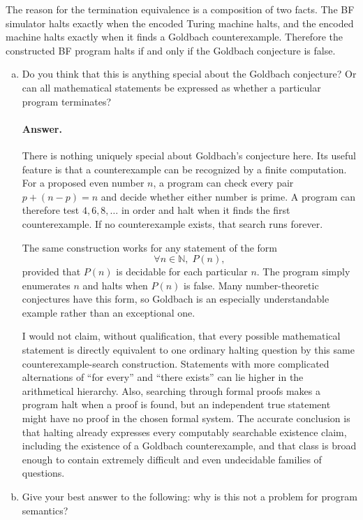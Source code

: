 \documentclass{article}
\begin{document}
\begin{enumerate}
The reason for the termination equivalence is a composition of two facts.  The
BF simulator halts exactly when the encoded Turing machine halts, and the
encoded machine halts exactly when it finds a Goldbach counterexample.
Therefore the constructed BF program halts if and only if the Goldbach
conjecture is false.

\begin{enumerate}[(a)]
\item Do you think that this is anything special about the Goldbach conjecture? Or can all mathematical statements
be expressed as whether a particular program terminates?

\paragraph{Answer.}
There is nothing uniquely special about Goldbach's conjecture here.  Its
useful feature is that a counterexample can be recognized by a finite
computation.  For a proposed even number $n$, a program can check every pair
$p+(n-p)=n$ and decide whether either number is prime.  A program can therefore
test $4,6,8,\ldots$ in order and halt when it finds the first counterexample.
If no counterexample exists, that search runs forever.

The same construction works for any statement of the form
\[
\forall n\in\mathbb{N},\;P(n),
\]
provided that $P(n)$ is decidable for each particular $n$.  The program simply
enumerates $n$ and halts when $P(n)$ is false.  Many number-theoretic
conjectures have this form, so Goldbach is an especially understandable
example rather than an exceptional one.

I would not claim, without qualification, that every possible mathematical
statement is directly equivalent to one ordinary halting question by this
same counterexample-search construction.  Statements with more complicated
alternations of ``for every'' and ``there exists'' can lie higher in the
arithmetical hierarchy.  Also, searching through formal proofs makes a program
halt when a proof is found, but an independent true statement might have no
proof in the chosen formal system.  The accurate conclusion is that halting
already expresses every computably searchable existence claim, including the
existence of a Goldbach counterexample, and that class is broad enough to
contain extremely difficult and even undecidable families of questions.

\item Give your best answer to the following:
why is this not a problem for program semantics?


\end{enumerate}
\end{enumerate}
\end{document}
